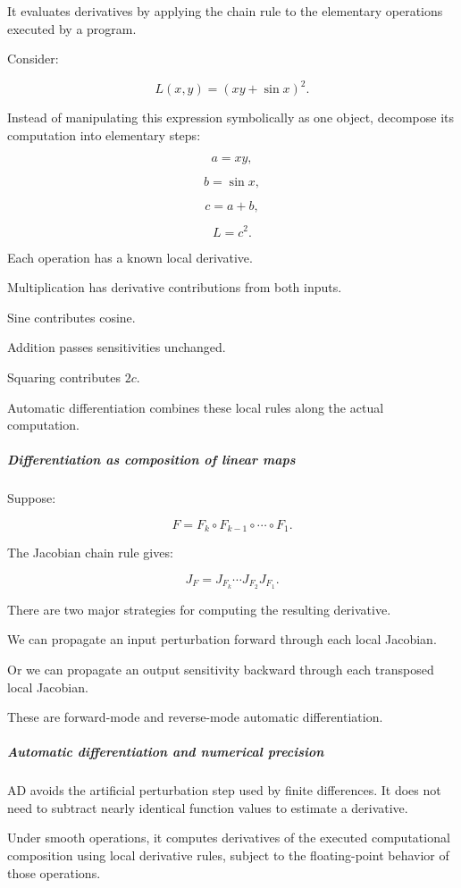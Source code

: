 It evaluates derivatives by applying the chain rule to the elementary operations executed by a program.

Consider:

\[
L(x,y)=\left(xy+\sin x\right)^2.
\]

Instead of manipulating this expression symbolically as one object, decompose its computation into elementary steps:

\[
a=xy,
\]

\[
b=\sin x,
\]

\[
c=a+b,
\]

\[
L=c^2.
\]

Each operation has a known local derivative.

Multiplication has derivative contributions from both inputs.

Sine contributes cosine.

Addition passes sensitivities unchanged.

Squaring contributes \(2c\).

Automatic differentiation combines these local rules along the actual computation.

\subparagraph{Differentiation as composition of linear maps}\label{differentiation-as-composition-of-linear-maps}

Suppose:

\[
F=F_k\circ F_{k-1}\circ\cdots\circ F_1.
\]

The Jacobian chain rule gives:

\[
J_F = J_{F_k}\cdots J_{F_2}J_{F_1}.
\]

There are two major strategies for computing the resulting derivative.

We can propagate an input perturbation forward through each local Jacobian.

Or we can propagate an output sensitivity backward through each transposed local Jacobian.

These are forward-mode and reverse-mode automatic differentiation.

\subparagraph{Automatic differentiation and numerical precision}\label{automatic-differentiation-and-numerical-precision}

AD avoids the artificial perturbation step used by finite differences. It does not need to subtract nearly identical function values to estimate a derivative.

Under smooth operations, it computes derivatives of the executed computational composition using local derivative rules, subject to the floating-point behavior of those operations.

